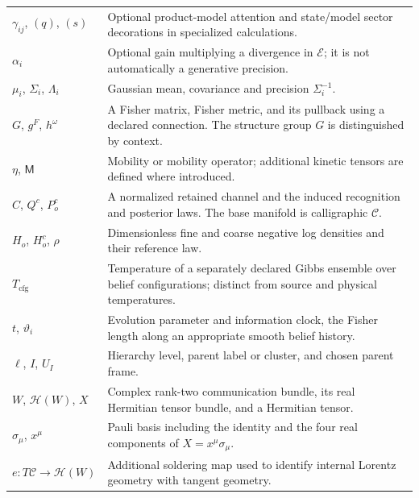 {\begin{longtable}{@{}p{}p{}@{}}
$\gamma_{ij}$, $(q)$, $(s)$ & Optional product-model attention and state/model sector decorations in specialized calculations.\\
$\alpha_i$ & Optional gain multiplying a divergence in $\mathcal E$; it is not automatically a generative precision.\\
$\mu_i$, $\Sigma_i$, $\Lambda_i$ & Gaussian mean, covariance and precision $\Sigma_i^{-1}$.\\
$G$, $g^F$, $h^\omega$ & A Fisher matrix, Fisher metric, and its pullback using a declared connection. The structure group $G$ is distinguished by context.\\
$\eta$, $\mathsf M$ & Mobility or mobility operator; additional kinetic tensors are defined where introduced.\\
$C$, $Q^c$, $P_o^c$ & A normalized retained channel and the induced recognition and posterior laws. The base manifold is calligraphic $\mathcal C$.\\
$H_o$, $H_o^c$, $\rho$ & Dimensionless fine and coarse negative log densities and their reference law.\\
$T_{\mathrm{cfg}}$ & Temperature of a separately declared Gibbs ensemble over belief configurations; distinct from source and physical temperatures.\\
$t$, $\vartheta_i$ & Evolution parameter and information clock, the Fisher length along an appropriate smooth belief history.\\
$\ell$, $I$, $U_I$ & Hierarchy level, parent label or cluster, and chosen parent frame.\\
$W$, $\mathcal H(W)$, $X$ & Complex rank-two communication bundle, its real Hermitian tensor bundle, and a Hermitian tensor.\\
$\sigma_\mu$, $x^\mu$ & Pauli basis including the identity and the four real components of $X=x^\mu\sigma_\mu$.\\
$e:T\mathcal C\to\mathcal H(W)$ & Additional soldering map used to identify internal Lorentz geometry with tangent geometry.\\
\end{longtable}
}
